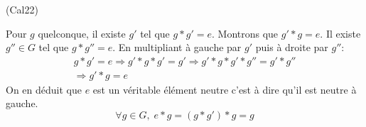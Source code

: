 \begin{tiny}(Cal22)\end{tiny} Pour $g$ quelconque, il existe $g'$ tel que $g*g'=e$. Montrons que $g'*g=e$.\newline
Il existe $g''\in G$ tel que $g*g''=e$. En multipliant à gauche par $g'$ puis à droite par $g''$:
\begin{multline*}
g*g' = e \Rightarrow g'*g*g'=g'
\Rightarrow g' * g * g' * g'' = g' * g'' \\
\Rightarrow g' * g = e
\end{multline*}
On en déduit que $e$ est un véritable élément neutre c'est à dire qu'il est neutre à gauche.
\begin{displaymath}
\forall g\in G,\;
e*g = (g*g')*g = g
\end{displaymath}
